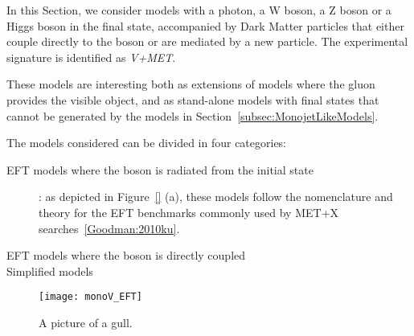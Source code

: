 
In this Section, we consider models with a photon, a W boson, a Z boson or a Higgs boson in the final state, 
accompanied by Dark Matter particles that either couple directly to the boson or are mediated by 
a new particle. The experimental signature is identified as \textit{V+MET}. 

These models are interesting both as extensions of models where the gluon provides the visible object,
and as stand-alone models with final states that cannot be generated by the models in
Section~\ref{subsec:MonojetLikeModels}.


The models considered can be divided in four categories:
\begin{description}
 \item[EFT models where the boson is radiated from the initial state]: as depicted in Figure~\ref{} (a), these
 models follow the nomenclature and theory for the EFT benchmarks commonly used by MET+X searches~\ref{Goodman:2010ku}. 
 \item[EFT models where the boson is directly coupled]
 \item[Simplified models]
\end{description}


\begin{figure}[h!]
  \centering
    \texttt{[image: monoV\_EFT]}
  \caption{A picture of a gull.\label{fig:monoV_EFT}}
\end{figure}